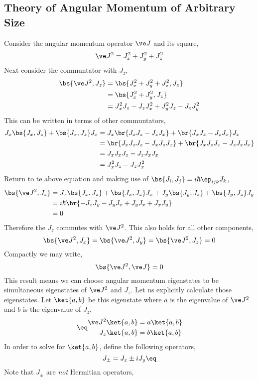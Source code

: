 \documentclass{article}
\begin{document}
\subsection{Theory of Angular Momentum of Arbitrary Size}
Consider the angular momentum operator $\ve J$ and its square,
\[ \ve J^2 = J_x^2 + J_y^2 + J_z^2 \]
Next consider the communtator with $J_z$,
\begin{align*}
\bs{\ve J^2, J_z}
&= \bs{J_x^2 + J_y^2 + J_z^2, J_z} \\
&= \bs{J_x^2 + J_y^2, J_z} \\
&= J_x^2 J_z - J_z J_x^2 + J_y^2 J_z - J_z J_y^2
\end{align*}
This can be written in terms of other communtators,
\begin{align*}
    J_x \bs{J_x, J_z} + \bs{J_x, J_z} J_x
    &=  J_x \br{J_xJ_z - J_zJ_x} + \br{J_xJ_z - J_zJ_x} J_x  \\
    &=  \br{J_xJ_xJ_z - J_xJ_zJ_x} + \br{J_xJ_zJ_x - J_zJ_xJ_x}  \\
    &=  J_xJ_xJ_z - J_zJ_xJ_x  \\
    &=  J_x^2J_z - J_zJ_x^2
\end{align*}
Return to te above equation and making use of $\bs{J_i, J_j} = i\hbar \ep_{ijk} J_k$,
\begin{align*}
\bs{\ve J^2, J_z}
&= J_x\bs{J_x, J_z} + \bs{J_x, J_z}J_x + J_y\bs{J_y, J_z}+ \bs{J_y, J_z}J_y \\
&= i\hbar\br{-J_xJ_y - J_yJ_x + J_yJ_x+ J_xJ_y} \\
&= 0
\end{align*}
Therefore the $J_z$ commutes with $\ve J^2$. This also holds for all other components,
\[ \bs{\ve J^2, J_x} = \bs{\ve J^2, J_y} = \bs{\ve J^2, J_z} = 0 \]
Compactly we may write,
\[ \bs{\ve J^2, \ve J}= 0 \]
This result means we can choose angular momentum eigenstates to be simultaneous eigenstates of $\ve J^2$ and $J_z$. Let us explicitly calculate those eigenstates. Let $\ket{a,b}$ be this eigenstate where $a$ is the eigenvalue of $\ve J^2$ and $b$ is the eigenvalue of $J_z$,
\begin{align*}
    \eq\label{eq:rotation_system}
    \begin{split}
    \ve J^2 \ket{a,b} &= a \ket{a,b} \\
    J_z \ket{a,b} &= b \ket{a,b}
    \end{split}
\end{align*}
In order to solve for $\ket{a,b}$, define the following operators,
\[ J_{\pm} = J_x \pm i J_y \eq \label{eq:defjpjm}\]
Note that $J_{\pm}$ are \textit{not} Hermitian operators,
\end{document}
